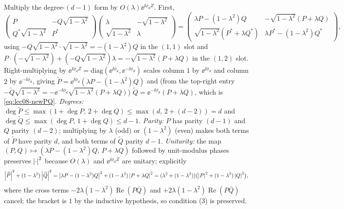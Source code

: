 \begin{solution}
Multiply the degree-$(d-1)$ form by $O(\lambda)\ee^{\ii\phi_d Z}$. First,
\[
  \begin{pmatrix}P&-Q\sqrt{1-\lambda^2}\\ Q^*\sqrt{1-\lambda^2}&P^*\end{pmatrix}
  \begin{pmatrix}\lambda&-\sqrt{1-\lambda^2}\\ \sqrt{1-\lambda^2}&\lambda\end{pmatrix}
  =\begin{pmatrix}\lambda P-(1-\lambda^2)Q & -\sqrt{1-\lambda^2}(P+\lambda Q)\\[3pt]
    \sqrt{1-\lambda^2}(P^*+\lambda Q^*)&\lambda P^*-(1-\lambda^2)Q^*\end{pmatrix},
\]
using $-Q\sqrt{1-\lambda^2}\cdot\sqrt{1-\lambda^2}=-(1-\lambda^2)Q$ in the $(1,1)$
slot and $P\cdot(-\sqrt{1-\lambda^2})+(-Q\sqrt{1-\lambda^2})\lambda
=-\sqrt{1-\lambda^2}(P+\lambda Q)$ in the $(1,2)$ slot. Right-multiplying by
$\ee^{\ii\phi_d Z}=\mathrm{diag}(\ee^{\ii\phi_d},\ee^{-\ii\phi_d})$ scales column $1$
by $\ee^{\ii\phi_d}$ and column $2$ by $\ee^{-\ii\phi_d}$, giving
$\widetilde P=\ee^{\ii\phi_d}(\lambda P-(1-\lambda^2)Q)$ and (from the top-right
entry $-\widetilde Q\sqrt{1-\lambda^2}=-\ee^{-\ii\phi_d}\sqrt{1-\lambda^2}(P+\lambda
Q)$) $\widetilde Q=\ee^{-\ii\phi_d}(P+\lambda Q)$, which is \eqref{eq:lec08-newPQ}.
\emph{Degrees:} $\deg\widetilde P\le\max(1+\deg P,\,2+\deg Q)\le\max(d,\,2+(d-2))=d$
and $\deg\widetilde Q\le\max(\deg P,\,1+\deg Q)\le d-1$. \emph{Parity:} $P$ has parity
$(d-1)$ and $Q$ parity $(d-2)$; multiplying by $\lambda$ (odd) or $(1-\lambda^2)$
(even) makes both terms of $\widetilde P$ have parity $d$, and both terms of
$\widetilde Q$ parity $d-1$. \emph{Unitarity:} the map
$(P,Q)\mapsto(\lambda P-(1-\lambda^2)Q,\,P+\lambda Q)$ followed by unit-modulus phases
preserves $\left\lvert \cdot \right\rvert^2$ because $O(\lambda)$ and $\ee^{\ii\phi_d Z}$ are unitary;
explicitly
\[
  \left\lvert \widetilde P \right\rvert^2+(1-\lambda^2)\left\lvert \widetilde Q \right\rvert^2
  =\left\lvert \lambda P-(1-\lambda^2)Q \right\rvert^2+(1-\lambda^2)\left\lvert P+\lambda Q \right\rvert^2
  =(\lambda^2+(1-\lambda^2))\bigl(\left\lvert P \right\rvert^2+(1-\lambda^2)\left\lvert Q \right\rvert^2\bigr),
\]
where the cross terms $-2\lambda(1-\lambda^2)\operatorname{Re}(P\bar Q)$ and
$+2\lambda(1-\lambda^2)\operatorname{Re}(P\bar Q)$ cancel; the bracket is $1$ by the
inductive hypothesis, so condition (3) is preserved.
\end{solution}

